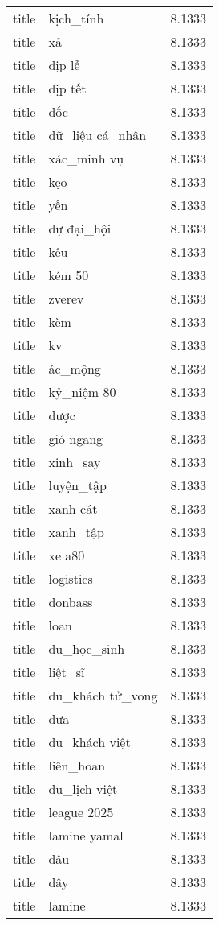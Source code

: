 \documentclass{article}
\begin{document}
\begin{tabular}{lll}
title & kịch\_tính & 8.1333\\
title & xả & 8.1333\\
title & dịp lễ & 8.1333\\
title & dịp tết & 8.1333\\
title & dốc & 8.1333\\
title & dữ\_liệu cá\_nhân & 8.1333\\
title & xác\_minh vụ & 8.1333\\
title & kẹo & 8.1333\\
title & yến & 8.1333\\
title & dự đại\_hội & 8.1333\\
title & kêu & 8.1333\\
title & kém 50 & 8.1333\\
title & zverev & 8.1333\\
title & kèm & 8.1333\\
title & kv & 8.1333\\
title & ác\_mộng & 8.1333\\
title & kỷ\_niệm 80 & 8.1333\\
title & dược & 8.1333\\
title & gió ngang & 8.1333\\
title & xinh\_say & 8.1333\\
title & luyện\_tập & 8.1333\\
title & xanh cát & 8.1333\\
title & xanh\_tập & 8.1333\\
title & xe a80 & 8.1333\\
title & logistics & 8.1333\\
title & donbass & 8.1333\\
title & loan & 8.1333\\
title & du\_học\_sinh & 8.1333\\
title & liệt\_sĩ & 8.1333\\
title & du\_khách tử\_vong & 8.1333\\
title & dưa & 8.1333\\
title & du\_khách việt & 8.1333\\
title & liên\_hoan & 8.1333\\
title & du\_lịch việt & 8.1333\\
title & league 2025 & 8.1333\\
title & lamine yamal & 8.1333\\
title & dâu & 8.1333\\
title & dây & 8.1333\\
title & lamine & 8.1333\\

\end{tabular}
\end{document}
